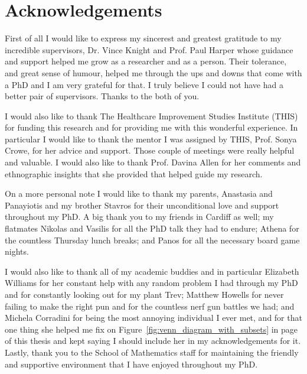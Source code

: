 \chapter*{Acknowledgements}

First of all I would like to express my sincerest and greatest gratitude to my
incredible supervisors, Dr. Vince Knight and Prof. Paul Harper whose guidance
and support helped me grow as a researcher and as a person.
Their tolerance, and great sense of humour, helped me through the ups and downs
that come with a PhD and I am very grateful for that.
I truly believe I could not have had a better pair of supervisors.
Thanks to the both of you.

I would also like to thank The Healthcare Improvement Studies Institute (THIS)
for funding this research and for providing me with this wonderful experience.
In particular I would like to thank the mentor I was assigned by THIS, Prof.
Sonya Crowe, for her advice and support.
Those couple of meetings were really helpful and valuable.
I would also like to thank Prof. Davina Allen for her comments and ethnographic
insights that she provided that helped guide my research.

On a more personal note I would like to thank my parents, Anastasia and
Panayiotis and my brother Stavros for their unconditional love and support
throughout my PhD.
A big thank you to my friends in Cardiff as well; my flatmates Nikolas and
Vasilis for all the PhD talk they had to endure; Athena for the countless
Thursday lunch breaks; and Panos for all the necessary board game nights.

I would also like to thank all of my academic buddies and in particular
Elizabeth Williams for her constant help with any random problem I had through
my PhD and for constantly looking out for my plant Trev; Matthew Howells for
never failing
to make the right pun and for the countless nerf gun battles we had; and
Michela Corradini for being the most annoying individual I ever met, and for
that one thing she helped me fix on Figure~\ref{fig:venn_diagram_with_subsets}
in page~\pageref{fig:venn_diagram_with_subsets} of this thesis and kept saying
I should include her in my acknowledgements for it.
Lastly, thank you to the School of Mathematics staff for maintaining the
friendly and supportive environment that I have enjoyed throughout my PhD.

